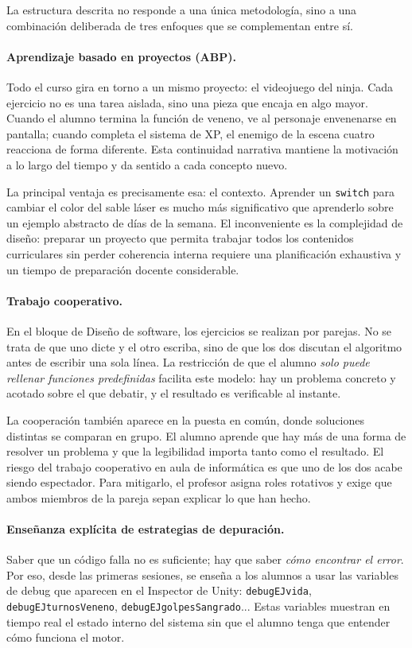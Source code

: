 \documentclass[a4paper,12pt]{article}
\begin{document}
La estructura descrita no responde a una única metodología, sino a una combinación
deliberada de tres enfoques que se complementan entre sí.

\paragraph{Aprendizaje basado en proyectos (ABP).}
Todo el curso gira en torno a un mismo proyecto: el videojuego del ninja. Cada
ejercicio no es una tarea aislada, sino una pieza que encaja en algo mayor. Cuando
el alumno termina la función de veneno, ve al personaje envenenarse en pantalla;
cuando completa el sistema de XP, el enemigo de la escena cuatro reacciona de
forma diferente. Esta continuidad narrativa mantiene la motivación a lo largo del
tiempo y da sentido a cada concepto nuevo.

La principal ventaja es precisamente esa: el contexto. Aprender un \texttt{switch}
para cambiar el color del sable láser es mucho más significativo que aprenderlo
sobre un ejemplo abstracto de días de la semana. El inconveniente es la complejidad
de diseño: preparar un proyecto que permita trabajar todos los contenidos
curriculares sin perder coherencia interna requiere una planificación exhaustiva
y un tiempo de preparación docente considerable.

\paragraph{Trabajo cooperativo.}
En el bloque de Diseño de software, los ejercicios se realizan por parejas. No
se trata de que uno dicte y el otro escriba, sino de que los dos discutan el
algoritmo antes de escribir una sola línea. La restricción de que el alumno
\textit{solo puede rellenar funciones predefinidas} facilita este modelo: hay un
problema concreto y acotado sobre el que debatir, y el resultado es verificable
al instante.

La cooperación también aparece en la puesta en común, donde soluciones distintas
se comparan en grupo. El alumno aprende que hay más de una forma de resolver un
problema y que la legibilidad importa tanto como el resultado. El riesgo del
trabajo cooperativo en aula de informática es que uno de los dos acabe siendo
espectador. Para mitigarlo, el profesor asigna roles rotativos y exige que ambos
miembros de la pareja sepan explicar lo que han hecho.

\paragraph{Enseñanza explícita de estrategias de depuración.}
Saber que un código falla no es suficiente; hay que saber \textit{cómo encontrar
el error}. Por eso, desde las primeras sesiones, se enseña a los alumnos a usar
las variables de debug que aparecen en el Inspector de Unity: \texttt{debugEJvida},
\texttt{debugEJturnosVeneno}, \texttt{debugEJgolpesSangrado}... Estas variables
muestran en tiempo real el estado interno del sistema sin que el alumno tenga
que entender cómo funciona el motor.
\end{document}
